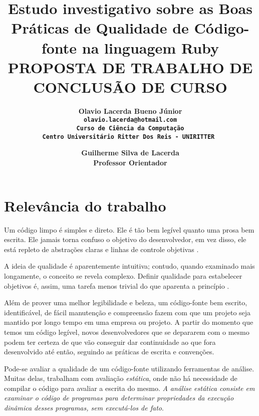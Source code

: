 \documentclass[11pt,a4paper]{article}
\begin{document}
\title{Estudo investigativo sobre as Boas Práticas de Qualidade de Código-fonte na linguagem Ruby\\ \smallskip
\small{ PROPOSTA DE TRABALHO DE CONCLUSÃO DE CURSO}}

\author{ \bf Olavio Lacerda Bueno Júnior\\
		\tt olavio.lacerda@hotmail.com \\
		Curso de Ciência da Computação \\
		Centro Universitário Ritter Dos Reis - UNIRITTER 
		\and
 		\bf Guilherme Silva de Lacerda\\
		Professor Orientador\\
}

\maketitle
\thispagestyle{empty}


\section{Relevância do trabalho} \label{sec:intro}

Um código limpo é simples e direto. Ele é tão bem legível quanto uma prosa bem escrita. Ele jamais torna confuso o objetivo do desenvolvedor, em vez disso, ele está repleto de abstrações claras e linhas de controle objetivas \cite{Grady:Clean}.

A ideia de qualidade é aparentemente intuitiva; contudo, quando examinado mais
longamente, o conceito se revela complexo. Definir qualidade para estabelecer objetivos
é, assim, uma tarefa menos trivial do que aparenta a princípio \cite{Novatec:Qualidade}.

Além de prover uma melhor legibilidade e beleza, um código-fonte bem escrito, identificável, de fácil manutenção e compreensão fazem com que um projeto seja mantido por longo tempo em uma empresa ou projeto. A partir do momento que temos um código legível, novos desenvolvedores que se depararem com o mesmo podem ter certeza de que vão conseguir dar continuidade ao que fora desenvolvido até então, seguindo as práticas de escrita e convenções.

Pode-se avaliar a qualidade de um código-fonte utilizando ferramentas de análise. Muitas delas, trabalham com avaliação \textit{estática}, onde não há necessidade de compilar o código para avaliar a escrita do mesmo. \textit{A análise estática consiste em examinar o código de programas para determinar propriedades
da execução dinâmica desses programas, sem executá-los de fato}\cite{Bergeron:Static}.
\end{document}
